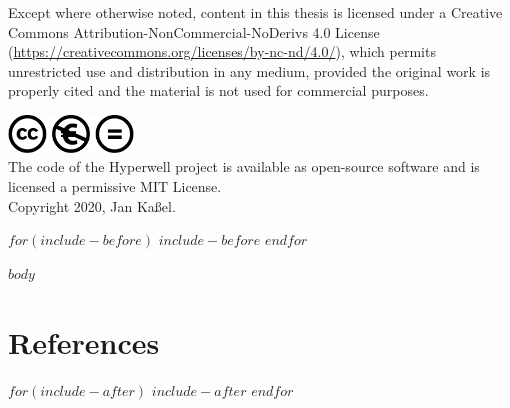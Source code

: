 \documentclass[12pt,a4paper,headings=standardclasses]{scrbook}
\begin{document}

Except where otherwise noted, content in this thesis is licensed under a Creative Commons Attribution-NonCommercial-NoDerivs 4.0 License (\url{https://creativecommons.org/licenses/by-nc-nd/4.0/}), which permits unrestricted use and distribution in any medium, provided the original work is properly cited and the material is not used for commercial purposes.

\vspace{2mm}
\includegraphics[width=0.25\textwidth]{layout/cc-nc-nd.pdf} \\

The code of the Hyperwell project is available as open-source software and is licensed a permissive MIT License. \\

Copyright 2020, Jan Kaßel.


\pagebreak

\tableofcontents
\newpage

$for(include-before)$
  $include-before$
$endfor$

$body$

{
  \footnotesize
  \chapter{References}
  \printbibliography
}
\newpage

$for(include-after)$
  $include-after$
$endfor$
\end{document}

